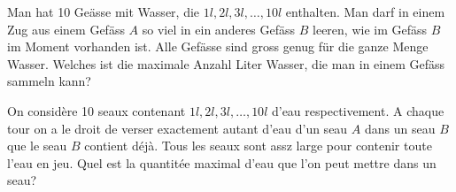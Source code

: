 Man hat 10 Geässe mit Wasser, die $1l, 2l, 3l, \ldots, 10l$ enthalten. Man darf in einem Zug aus einem Gefäss $A$ so viel in ein anderes Gefäss $B$ leeren, wie im Gefäss $B$ im Moment vorhanden ist. Alle Gefässe sind gross genug für die ganze Menge Wasser. Welches ist die maximale Anzahl Liter Wasser, die man in einem Gefäss sammeln kann?

\bigskip

On considère 10 seaux contenant $1l, 2l, 3l, \ldots, 10l$ d'eau respectivement. A chaque tour on a le droit de verser exactement autant d'eau d'un seau $A$ dans un seau $B$ que le seau $B$ contient déjà. Tous les seaux sont assz large pour contenir toute l'eau en jeu. Quel est la quantitée maximal d'eau que l'on peut mettre dans un seau?